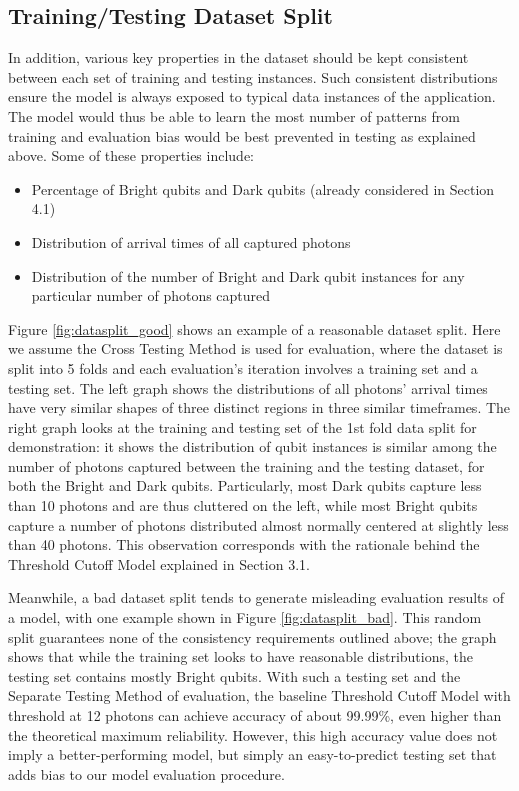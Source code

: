 \documentclass[letterpaper,twocolumn,10pt]{article}
\begin{document}
\subsection{Training/Testing Dataset Split}

In addition, various key properties in the dataset should be kept consistent between each set of training and testing instances. Such consistent distributions ensure the model is always exposed to typical data instances of the application. The model would thus be able to learn the most number of patterns from training and evaluation bias would be best prevented in testing as explained above. Some of these properties include:

\begin{itemize}
    \item Percentage of Bright qubits and Dark qubits (already considered in Section 4.1)
    \item Distribution of arrival times of all captured photons
    \item Distribution of the number of Bright and Dark qubit instances for any particular number of photons captured
\end{itemize}

Figure \ref{fig:datasplit_good} shows an example of a reasonable dataset split. Here we assume the Cross Testing Method is used for evaluation, where the dataset is split into 5 folds and each evaluation's iteration involves a training set and a testing set. The left graph shows the distributions of all photons' arrival times have very similar shapes of three distinct regions in three similar timeframes. The right graph looks at the training and testing set of the 1st fold data split for demonstration: it shows the distribution of qubit instances is similar among the number of photons captured between the training and the testing dataset, for both the Bright and Dark qubits. Particularly, most Dark qubits capture less than 10 photons and are thus cluttered on the left, while most Bright qubits capture a number of photons distributed almost normally centered at slightly less than 40 photons. This observation corresponds with the rationale behind the Threshold Cutoff Model explained in Section 3.1. 

Meanwhile, a bad dataset split tends to generate misleading evaluation results of a model, with one example shown in Figure \ref{fig:datasplit_bad}. This random split guarantees none of the consistency requirements outlined above; the graph shows that while the training set looks to have reasonable distributions, the testing set contains mostly Bright qubits. With such a testing set and the Separate Testing Method of evaluation, the baseline Threshold Cutoff Model with threshold at 12 photons can achieve accuracy of about 99.99\%, even higher than the theoretical maximum reliability. However, this high accuracy value does not imply a better-performing model, but simply an easy-to-predict testing set that adds bias to our model evaluation procedure.
\end{document}
